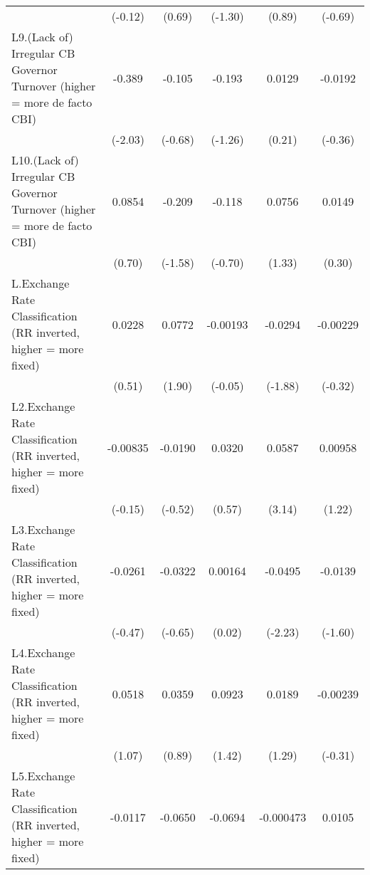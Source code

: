 {\begin{longtable}{l*{5}{c}}
                &  (-0.12)         &   (0.69)         &  (-1.30)         &   (0.89)         &  (-0.69)         \\
\addlinespace
L9.(Lack of) Irregular CB Governor Turnover (higher = more de facto CBI)&   -0.389\sym{*}  &   -0.105         &   -0.193         &   0.0129         &  -0.0192         \\
                &  (-2.03)         &  (-0.68)         &  (-1.26)         &   (0.21)         &  (-0.36)         \\
\addlinespace
L10.(Lack of) Irregular CB Governor Turnover (higher = more de facto CBI)&   0.0854         &   -0.209         &   -0.118         &   0.0756         &   0.0149         \\
                &   (0.70)         &  (-1.58)         &  (-0.70)         &   (1.33)         &   (0.30)         \\
\addlinespace
L.Exchange Rate Classification (RR inverted, higher = more fixed)&   0.0228         &   0.0772         & -0.00193         &  -0.0294         & -0.00229         \\
                &   (0.51)         &   (1.90)         &  (-0.05)         &  (-1.88)         &  (-0.32)         \\
\addlinespace
L2.Exchange Rate Classification (RR inverted, higher = more fixed)& -0.00835         &  -0.0190         &   0.0320         &   0.0587\sym{**} &  0.00958         \\
                &  (-0.15)         &  (-0.52)         &   (0.57)         &   (3.14)         &   (1.22)         \\
\addlinespace
L3.Exchange Rate Classification (RR inverted, higher = more fixed)&  -0.0261         &  -0.0322         &  0.00164         &  -0.0495\sym{*}  &  -0.0139         \\
                &  (-0.47)         &  (-0.65)         &   (0.02)         &  (-2.23)         &  (-1.60)         \\
\addlinespace
L4.Exchange Rate Classification (RR inverted, higher = more fixed)&   0.0518         &   0.0359         &   0.0923         &   0.0189         & -0.00239         \\
                &   (1.07)         &   (0.89)         &   (1.42)         &   (1.29)         &  (-0.31)         \\
\addlinespace
L5.Exchange Rate Classification (RR inverted, higher = more fixed)&  -0.0117         &  -0.0650         &  -0.0694         &-0.000473         &   0.0105         \\

\end{longtable}}
